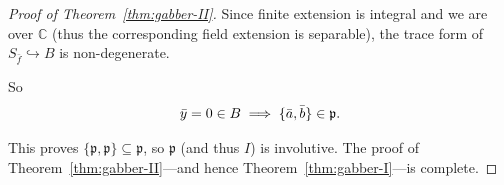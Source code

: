 \begin{proof}[Proof of Theorem~\ref{thm:gabber-II}]
	\noindent Since finite extension is integral and we are over $\mathbb{C}$ (thus the corresponding field extension is separable), the trace form of $S_{\bar f} \hookrightarrow B$ is non-degenerate.

	\noindent So
	\[
		\bar{y} = 0 \in B \implies \{\bar{a}, \bar{b}\} \in \frak{p}.
	\]

	This proves $\{\mathfrak p,\mathfrak p\}\subseteq \mathfrak p$, so $\mathfrak p$ (and thus $I$) is involutive.  The proof of
	Theorem~\ref{thm:gabber-II}---and hence Theorem~\ref{thm:gabber-I}---is complete.

\end{proof}